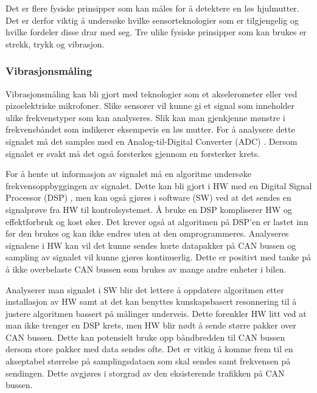 Det er flere fysiske prinsipper som kan måles for å detektere en løs hjulmutter.
Det er derfor viktig å undersøke hvilke sensorteknologier som er tilgjengelig og
hvilke fordeler disse drar med seg. Tre ulike fysiske prinsipper som kan brukes er strekk, trykk og vibrasjon. 

\subsubsection{Vibrasjonsmåling}

Vibrasjonsmåling kan bli gjort med teknologier som et akselerometer eller ved
pizoelektriske mikrofoner. Slike sensorer vil kunne gi et signal som inneholder
ulike frekvenstyper som kan analyseres. Slik kan man gjenkjenne mønstre i
frekvensbåndet som indikerer eksempevis en løs mutter. For å analysere dette signalet må det
samples med en Analog-til-Digital Converter (ADC) \cite{adc}. Dersom signalet er svakt må det også forsterkes gjennom en
forsterker krets. 

For å hente ut informasjon av signalet må en algoritme undersøke
frekvensoppbyggingen av signalet. Dette kan bli gjort i HW med en Digital Signal Processor (DSP) \cite{dsp}, men kan
også gjøres i software (SW) ved at det sendes en signalprøve fra HW til kontrolsystemet. Å
bruke en DSP kompliserer HW og effektforbruk og kost øker. Det krever også at algoritmen på DSP'en 
er lastet inn før den brukes og kan ikke endres uten at den omprogrammeres. Analyseres signalene i HW kan vil
det kunne sendes korte datapakker på CAN bussen og sampling av signalet vil kunne gjøres kontinuerlig. Dette er
positivt med tanke på å ikke overbelaste CAN bussen som brukes av mange andre enheter i bilen. 

Analyserer man signalet i SW blir det lettere å oppdatere algoritmen etter installasjon av HW
samt at det kan benyttes kunskapsbasert resonnering til å justere algoritmen bassert på målinger underveis. 
Dette forenkler HW litt ved at man ikke trenger en DSP krets, men HW blir nødt å sende større pakker over CAN
bussen. Dette kan potensielt bruke opp båndbredden til CAN bussen dersom store pakker med data sendes ofte. 
Det er vitkig å komme frem til en akseptabel størrelse på samplingsdataen som skal sendes samt frekvensen på
sendingen. Dette avgjøres i storgrad av den eksisterende trafikken på CAN bussen.

%

